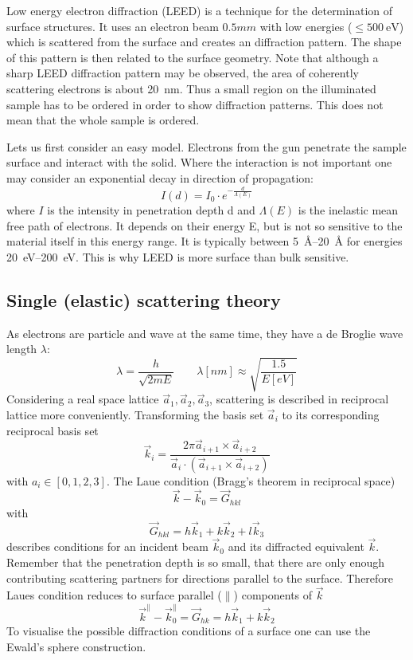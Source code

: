 Low energy electron diffraction (LEED) is a technique for the determination of surface structures. It uses an electron beam $0.5mm$ with low energies ($\leq \SI{500}{\eV}$) which is scattered from the surface and creates an diffraction pattern. The shape of this pattern is then related to the surface geometry. Note that although a sharp LEED diffraction pattern may be observed, the area of coherently scattering electrons is about \SI{20}{\nm}. Thus a small region on the illuminated sample has to be ordered in order to show diffraction patterns. This does not mean that the whole sample is ordered.


Lets us first consider an easy model. Electrons from the gun penetrate the sample surface and interact with the solid. Where the interaction is not important one may consider an exponential decay in direction of propagation:
$$I(d)=I_0\cdot e^{-\frac{d}{\Lambda(E)}}$$ where $I$ is the intensity in penetration depth d and $\Lambda(E)$ is the inelastic mean free path of electrons. It depends on their energy E, but is not so sensitive to the material itself in this energy range. It is typically between \SIrange{5}{20}{\angstrom} for energies \SIrange{20}{200}{\eV}. This is why LEED is more surface than bulk sensitive.

\subsection{Single (elastic) scattering theory}
As electrons are particle and wave at the same time, they have a  de Broglie wave length $\lambda$:
$$\lambda=\frac{h}{\sqrt{2mE}} \qquad \lambda[nm] \approx \sqrt{\frac{1.5}{E[eV]}}$$
Considering a real space lattice {$\vec a_1,\vec a_2,\vec a_3$}, scattering is described in reciprocal lattice more conveniently. Transforming the basis set $\vec a_i$ to its corresponding reciprocal basis set 
$$\vec k_i=\frac{2\pi \vec a_{i+1}\times\vec a_{i+2}}{\vec a_i\cdot(\vec a_{i+1}\times \vec a_{i+2})}$$ with $a_i \in [0,1,2,3]$.
The Laue condition (Bragg's theorem in reciprocal space) $$\vec k-\vec k_0 = \vec G_{hkl}$$ with $$\vec G_{hkl}=h\vec k_1+k\vec k_2+l\vec k_3$$ describes conditions for an incident beam $\vec k_0$ and its diffracted equivalent $\vec k$. Remember that the penetration depth is so small, that there are only enough contributing scattering partners for directions parallel to the surface. Therefore Laues condition reduces to surface parallel ($\parallel$) components of $\vec k$ $$\vec k^{\parallel}-\vec k^{\parallel}_0=\vec G_{hk}=h\vec k_1 + k \vec k_2$$ To visualise the possible diffraction conditions of a surface one can use the Ewald's sphere construction.
